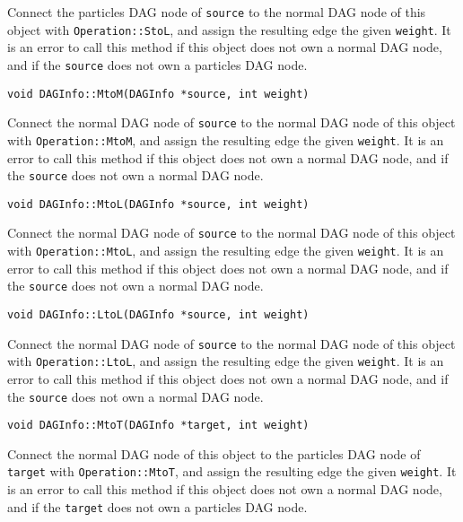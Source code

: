 Connect the particles DAG node of \texttt{source} to the normal DAG node of
this object with \texttt{Operation::StoL}, and assign the resulting edge the
given \texttt{weight}. It is an error to call this method if this object does
not own a normal DAG node, and if the \texttt{source} does not own a particles
DAG node.

\begin{lstlisting}
void DAGInfo::MtoM(DAGInfo *source, int weight)
\end{lstlisting}


Connect the normal DAG node of \texttt{source} to the normal DAG node of
this object with \texttt{Operation::MtoM}, and assign the resulting edge the
given \texttt{weight}. It is an error to call this method if this object does
not own a normal DAG node, and if the \texttt{source} does not own a normal
DAG node.

\begin{lstlisting}
void DAGInfo::MtoL(DAGInfo *source, int weight)
\end{lstlisting}


Connect the normal DAG node of \texttt{source} to the normal DAG node of
this object with \texttt{Operation::MtoL}, and assign the resulting edge the
given \texttt{weight}. It is an error to call this method if this object does
not own a normal DAG node, and if the \texttt{source} does not own a normal
DAG node.

\begin{lstlisting}
void DAGInfo::LtoL(DAGInfo *source, int weight)
\end{lstlisting}


Connect the normal DAG node of \texttt{source} to the normal DAG node of
this object with \texttt{Operation::LtoL}, and assign the resulting edge the
given \texttt{weight}. It is an error to call this method if this object does
not own a normal DAG node, and if the \texttt{source} does not own a normal
DAG node.

\begin{lstlisting}
void DAGInfo::MtoT(DAGInfo *target, int weight)
\end{lstlisting}


Connect the normal DAG node of this object to the particles DAG node of
\texttt{target} with \texttt{Operation::MtoT}, and assign the resulting edge
the given \texttt{weight}. It is an error to call this method if this object
does not own a normal DAG node, and if the \texttt{target} does not own a
particles DAG node.

